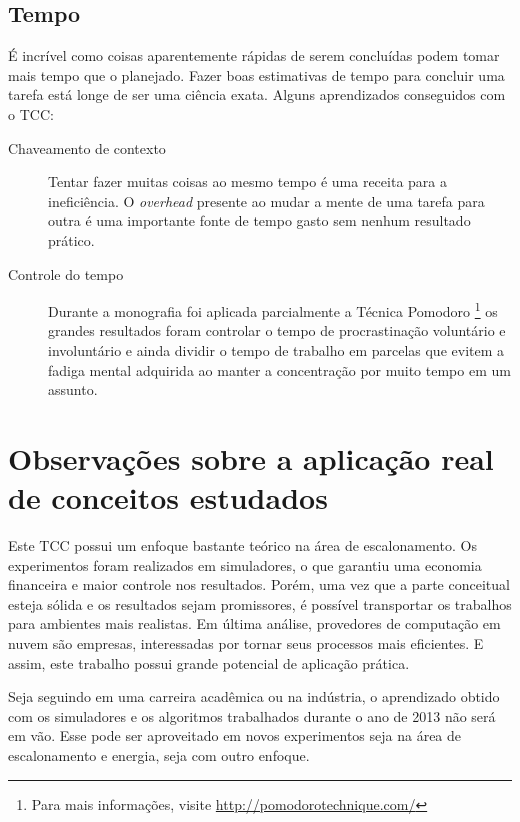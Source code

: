 
\subsection{Tempo} %
\label{sub:tempo}

É incrível como coisas aparentemente rápidas de serem concluídas podem tomar
mais tempo que o planejado. Fazer boas estimativas de tempo para concluir uma
tarefa está longe de ser uma ciência exata. Alguns aprendizados conseguidos com
o TCC:

\begin{description}
	\item[Chaveamento de contexto] Tentar fazer muitas coisas ao mesmo tempo é
		uma receita para a ineficiência. O \emph{overhead} presente ao mudar
		a mente de uma tarefa para outra é uma importante fonte de tempo gasto
		sem nenhum resultado prático.
	\item[Controle do tempo] Durante a monografia foi aplicada parcialmente a
		Técnica Pomodoro \footnote{Para mais informações,
		visite \url{http://pomodorotechnique.com/}} os grandes resultados foram
		controlar o tempo de procrastinação voluntário e involuntário e ainda
		dividir o tempo de trabalho em parcelas que evitem a fadiga mental
		adquirida ao manter a concentração por muito tempo em um assunto.
\end{description}


\section{Observações sobre a aplicação real de conceitos estudados}
\label{sec:observacoes_sobre_aplicacao_real}

Este TCC possui um enfoque bastante teórico na área de escalonamento. Os
experimentos foram realizados em simuladores, o que garantiu uma economia
financeira e maior controle nos resultados. Porém, uma vez que a parte
conceitual esteja sólida e os resultados sejam promissores, é possível
transportar os trabalhos para ambientes mais realistas. Em última análise,
provedores de computação em nuvem  são empresas, interessadas por tornar seus
processos mais eficientes. E assim, este trabalho possui grande potencial de
aplicação prática.

Seja seguindo em uma carreira acadêmica ou na indústria, o aprendizado obtido
com os simuladores e os algoritmos trabalhados durante o ano de 2013 não será
em vão. Esse pode ser aproveitado em novos experimentos seja na área de
escalonamento e energia, seja com outro enfoque.